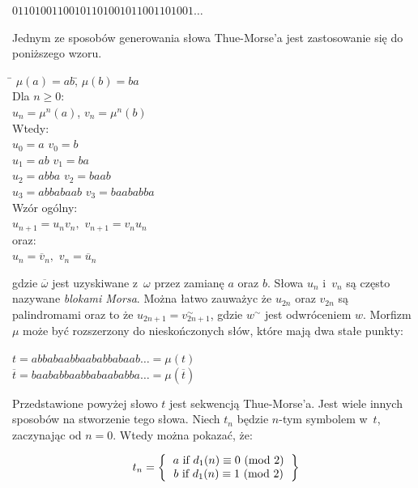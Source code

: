 \documentclass[document]{xmgr}
\begin{document}
{\centering $01101001100101101001011001101001\ldots$ \par}

\noindent Jednym ze sposobów generowania słowa Thue-Morse'a jest zastosowanie się do poniższego wzoru.

\begin{tabbing}

\hspace{8em}\= $\mu(a) = ab$,\hspace{7em}\= $\mu(b) = ba$\\
Dla $n \geq 0$:\\
\> $u_n = \mu^n(a)$,\> $v_n = \mu^n(b)$\\
Wtedy:\\
\> $u_0 = a$ \> $v_0 = b$\\
\> $u_1 = ab$ \> $v_1 = ba$\\
\> $u_2 = abba$	 \> $v_2 = baab$\\
\> $u_3 = abbabaab$ \> $v_3 = baababba$\\
Wzór ogólny:\\
\> $u_{n+1} = u_n v_n,$ \> $v_{n+1} = v_n u_n$\\
oraz:\\
\> $u_n = \overline{v}_n,$ \> $v_n = \overline{u}_n$
\end{tabbing}

gdzie $\overline{\omega}$ jest uzyskiwane z~$\omega$ przez zamianę $a$ oraz $b$. Słowa $u_n$ i~$v_n$ są często nazywane \emph{blokami Morsa}. Można łatwo zauważyc że $u_{2n}$ oraz $v_{2n}$ są palindromami oraz to że $u_{2n+1} =  v^{\sim}_{2n+1}$, gdzie $w^{\sim}$ jest odwróceniem $w$. Morfizm $\mu$ może być rozszerzony do nieskończonych słów, które mają dwa stałe punkty:

{\centering 
$t = abbabaabbaababbabaab\ldots = \mu(t)$ \\
$ \overline{t} = baababbaabbabaababba\ldots = \mu(\overline{t})$
\par}

\noindent Przedstawione powyżej słowo $t$ jest sekwencją Thue-Morse'a. Jest wiele innych sposobów na stworzenie tego słowa. Niech $t_n$ będzie $n$-tym symbolem w~$t$, zaczynając od $n=0$. Wtedy można pokazać, że:

\[
t_n=
\left \{
\begin{tabular}{ccc}
$a$\ if$\ d_1(n) \equiv 0$ (mod $2$) \\
$b$\ if$\ d_1(n) \equiv 1$ (mod $2$)
\end{tabular}
\right \}
\]
\end{document}
